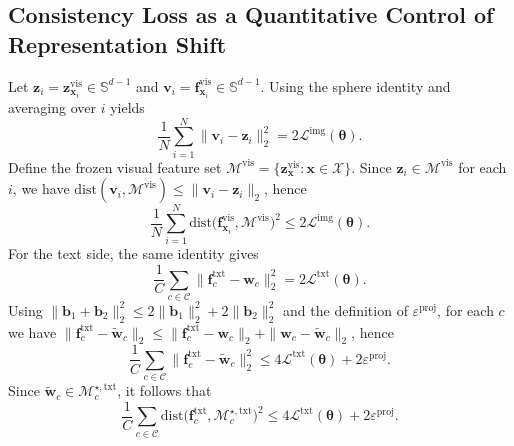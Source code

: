 \documentclass{article}
\theoremstyle{plain}
\theoremstyle{definition}
\theoremstyle{remark}
\begin{document}
	\subsection{Consistency Loss as a Quantitative Control of Representation Shift}
	Let $\mathbf{z}_i=\mathbf{z}^{\mathrm{vis}}_{\mathbf{x}_i}\in\mathbb S^{d-1}$ and $\mathbf{v}_i=\mathbf{f}^{\mathrm{vis}}_{\mathbf{x}_i}\in\mathbb S^{d-1}$. Using the sphere identity and averaging over $i$ yields
	\begin{equation*}
		\frac{1}{N}\sum_{i=1}^N\|\mathbf{v}_i-\mathbf{z}_i\|_2^2
		=
		2\mathcal L^{\mathrm{img}}(\boldsymbol{\theta}).
	\end{equation*}
	Define the frozen visual feature set $\mathcal{M}^{\mathrm{vis}}=\{\mathbf{z}^{\mathrm{vis}}_{\mathbf{x}}:\mathbf{x}\in \mathcal{X}\}$. Since $\mathbf{z}_i\in \mathcal{M}^{\mathrm{vis}}$ for each $i$, we have $\mathrm{dist}(\mathbf{v}_i,\mathcal{M}^{\mathrm{vis}})\le\|\mathbf{v}_i-\mathbf{z}_i\|_2$, hence
	\begin{equation*}
		\frac{1}{N}\sum_{i=1}^N\mathrm{dist}\bigl(\mathbf{f}^{\mathrm{vis}}_{\mathbf{x}_i},\mathcal{M}^{\mathrm{vis}}\bigr)^2
		\le
		2\mathcal L^{\mathrm{img}}(\boldsymbol{\theta}).
	\end{equation*}
	For the text side, the same identity gives
	\begin{equation*}
		\frac{1}{C}\sum_{c\in \mathcal{C}}\bigl\|\mathbf{f}^{\mathrm{txt}}_{c}-\mathbf{w}_{c}\bigr\|_2^2
		=
		2\mathcal L^{\mathrm{txt}}(\boldsymbol{\theta}).
	\end{equation*}
	Using $\|\mathbf{b}_1+\mathbf{b}_2\|_2^2\le 2\|\mathbf{b}_1\|_2^2+2\|\mathbf{b}_2\|_2^2$ and the definition of $\varepsilon^{\mathrm{proj}}$, for each $c$ we have $\bigl\|\mathbf{f}^{\mathrm{txt}}_{c}-\tilde{\mathbf{w}}_{c}\bigr\|_2\le\bigl\|\mathbf{f}^{\mathrm{txt}}_{c}-\mathbf{w}_{c}\bigr\|_2+\|\mathbf{w}_{c}-\tilde{\mathbf{w}}_{c}\|_2$, hence
	\begin{equation*}
		\frac{1}{C}\sum_{c\in \mathcal{C}}\bigl\|\mathbf{f}^{\mathrm{txt}}_{c}-\tilde{\mathbf{w}}_{c}\bigr\|_2^2
		\le
		4\mathcal L^{\mathrm{txt}}(\boldsymbol{\theta})+2\varepsilon^{\mathrm{proj}}.
	\end{equation*}
	Since $\tilde{\mathbf{w}}_{c}\in \mathcal{M}^{\star,\mathrm{txt}}_{c}$, it follows that
	\begin{equation*}
		\frac{1}{C}\sum_{c\in \mathcal{C}}\mathrm{dist}\bigl(\mathbf{f}^{\mathrm{txt}}_{c},\mathcal{M}^{\star,\mathrm{txt}}_{c}\bigr)^2
		\le
		4\mathcal L^{\mathrm{txt}}(\boldsymbol{\theta})+2\varepsilon^{\mathrm{proj}}.
	\end{equation*}
\end{document}

